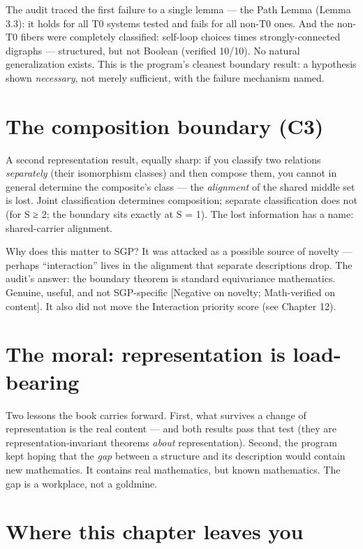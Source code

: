 \documentclass[
  11pt,
]{book}
\begin{document}
The audit traced the first failure to a single lemma --- the Path Lemma
(Lemma 3.3): it holds for all T0 systems tested and fails for all non-T0
ones. And the non-T0 fibers were completely classified: self-loop
choices times strongly-connected digraphs --- structured, but not
Boolean (verified 10/10). No natural generalization exists. This is the
program's cleanest boundary result: a hypothesis shown \emph{necessary},
not merely sufficient, with the failure mechanism named.

\section{The composition boundary
(C3)}\label{the-composition-boundary-c3}

A second representation result, equally sharp: if you classify two
relations \emph{separately} (their isomorphism classes) and then compose
them, you cannot in general determine the composite's class --- the
\emph{alignment} of the shared middle set is lost. Joint classification
determines composition; separate classification does not (for
\textbar S\textbar{} ≥ 2; the boundary sits exactly at
\textbar S\textbar{} = 1). The lost information has a name:
shared-carrier alignment.

Why does this matter to SGP? It was attacked as a possible source of
novelty --- perhaps ``interaction'' lives in the alignment that separate
descriptions drop. The audit's answer: the boundary theorem is standard
equivariance mathematics. Genuine, useful, and not SGP-specific
{[}Negative on novelty; Math-verified on content{]}. It also did not
move the Interaction priority score (see Chapter 12).

\section{The moral: representation is
load-bearing}\label{the-moral-representation-is-load-bearing}

Two lessons the book carries forward. First, what survives a change of
representation is the real content --- and both results pass that test
(they are representation-invariant theorems \emph{about}
representation). Second, the program kept hoping that the \emph{gap}
between a structure and its description would contain new mathematics.
It contains real mathematics, but known mathematics. The gap is a
workplace, not a goldmine.

\section{Where this chapter leaves
you}\label{where-this-chapter-leaves-you-9}
\end{document}
